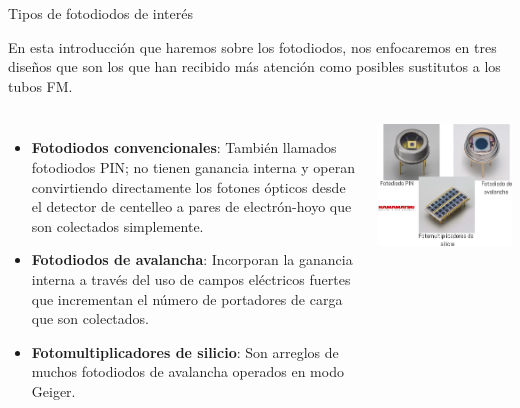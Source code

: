 \documentclass[a4paper,10pt]{beamer}
\begin{document}
\begin{frame}{Tipos de fotodiodos de interés}
 
 En esta introducción que haremos sobre los fotodiodos, nos enfocaremos en tres 
 diseños que son los que han recibido más atención como posibles sustitutos a los 
 tubos FM.
 
 \begin{columns}[c]
  
  \column{3in}
 
 \begin{itemize}
  \item \begin{justify}
         \textbf{Fotodiodos convencionales}: También llamados fotodiodos PIN; no 
         tienen ganancia interna y operan convirtiendo directamente los fotones 
         ópticos desde el detector de centelleo a pares de electrón-hoyo que 
         son colectados simplemente.
        \end{justify}
  \item \begin{justify}
         \textbf{Fotodiodos de avalancha}: Incorporan la ganancia interna a través 
         del uso de campos eléctricos fuertes que incrementan el número de 
         portadores de carga que son colectados.
        \end{justify}
  \item \begin{justify}
         \textbf{Fotomultiplicadores de silicio}: Son arreglos de muchos fotodiodos 
         de avalancha operados en modo Geiger.
        \end{justify}
 \end{itemize}
 
 \column{2in}
  \center
  \includegraphics[scale=0.2]{fig39}
  
  \end{columns}
 
\end{frame}
\end{document}
